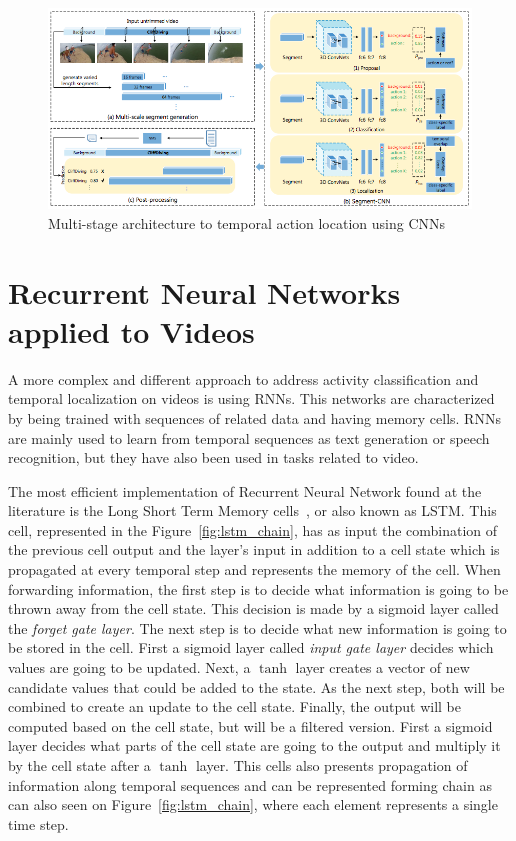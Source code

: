 \begin{figure}[hb]
\begin{center}
\includegraphics[width=1\linewidth]{img/stateofart/multistage}
\end{center}
\caption{Multi-stage architecture to temporal action location using CNNs}
\label{fig:multistage}
\end{figure}


\section{Recurrent Neural Networks applied to Videos}

A more complex and different approach to address activity classification and temporal localization on videos is using RNNs. This networks are characterized by being trained with sequences of related data and having memory cells. RNNs are mainly used to learn from temporal sequences as text generation or speech recognition, but they have also been used in tasks related to video.

The most efficient implementation of Recurrent Neural Network found at the literature is the Long Short Term Memory cells~\cite{hochreiter1997long}, or also known as LSTM. This cell, represented in the Figure~\ref{fig:lstm_chain}, has as input the combination of the previous cell output and the layer's input in addition to a cell state which is propagated at every temporal step and represents the memory of the cell.
When forwarding information, the first step is to decide what information is going to be thrown away from the cell state. This decision is made by a sigmoid layer called the \textit{forget gate layer}.
The next step is to decide what new information is going to be stored in the cell. First a sigmoid layer called \textit{input gate layer} decides which values are going to be updated. Next, a $\tanh$ layer creates a vector of new candidate values that could be added to the state. As the next step, both will be combined to create an update to the cell state.
Finally, the output will be computed based on the cell state, but will be a filtered version. First a sigmoid layer decides what parts of the cell state are going to the output and multiply it by the cell state after a $\tanh$ layer.
This cells also presents propagation of information along temporal sequences and can be represented forming chain as can also seen on Figure~\ref{fig:lstm_chain}, where each element represents a single time step.

